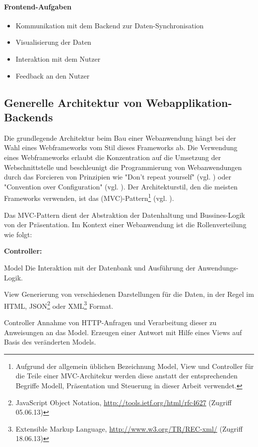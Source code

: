 \paragraph{\gls{Frontend}-Aufgaben}
\begin{itemize}
  \item Kommunikation mit dem \gls{Backend} zur Daten-Synchronisation 
  \item Visualisierung der Daten
  \item Interaktion mit dem Nutzer
  \item Feedback an den Nutzer
\end{itemize}
\subsection{Generelle Architektur von Webapplikation-\gls{Backend}s}

Die grundlegende Architektur beim Bau einer Webanwendung hängt bei der Wahl eines Webframeworks vom Stil dieses \gls{Framework}s ab. Die Verwendung eines Webframeworks erlaubt die Konzentration auf die Umsetzung der Webschnittstelle und beschleunigt die Programmierung von Webanwendungen durch das Forcieren von Prinzipien wie "Don't repeat yourself" (vgl. \cite[p.~23]{pragmatic-programmer}) oder "Convention over Configuration" (vgl. \cite[p.~3]{maven}). Der Architekturstil, den die meisten \gls{Framework}s verwenden, ist das  (MVC)-Pattern\footnote{Aufgrund der allgemein üblichen Bezeichnung Model, View und Controller für die Teile einer MVC-Architekur werden diese anstatt der entsprechenden Begriffe Modell, Präsentation und Steuerung in dieser Arbeit verwendet.} (vgl. \cite[p.~14]{gang-of-four}). 

Das MVC-Pattern dient der Abstraktion der Datenhaltung und Bussines-Logik von der Präsentation. Im Kontext einer Webanwendung ist die Rollenverteilung wie folgt:
\begin{labeling}{\textbf{Controller:}}
\item[Model] Die Interaktion mit der Datenbank und Ausführung der Anwendungs-Logik.
\item[View] Generierung von verschiedenen Darstellungen für die Daten, in der Regel im HTML, JSON\footnote{JavaScript Object Notation, \url{http://tools.ietf.org/html/rfc4627} (Zugriff 05.06.13)} oder XML\footnote{Extensible Markup Language, \url{http://www.w3.org/TR/REC-xml/} (Zugriff 18.06.13)} Format.
\item[Controller] Annahme von HTTP-Anfragen und  Verarbeitung dieser zu Anweisungen an das Model. Erzeugen einer Antwort mit Hilfe eines Views auf Basis des veränderten Models.
\end{labeling}

